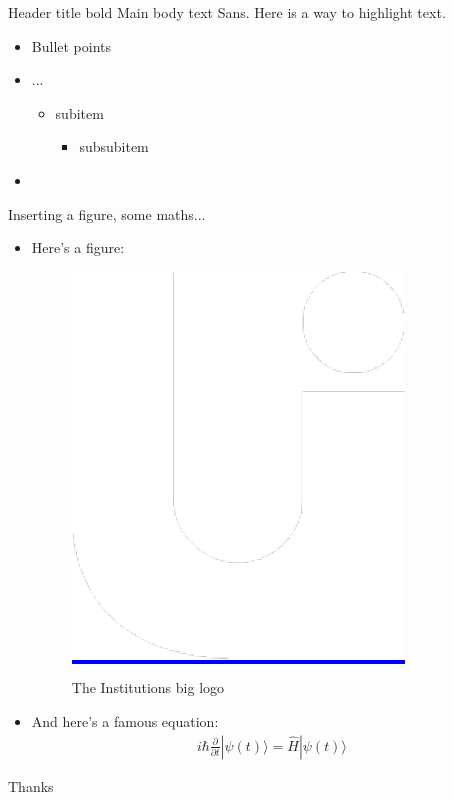 \documentclass{beamer}
\begin{document}
\begin{frame}[t]{Header title bold}
	Main body text Sans. Here is a way to \alert{highlight text}.
	\label{sec:Test1}
	\begin{itemize}
		\item Bullet points
		\item ...
			\begin{itemize}
				\item subitem
					\begin{itemize}
						\item subsubitem
					\end{itemize}
			\end{itemize}
		\item \lipsum[2]
	\end{itemize}
\end{frame}


\begin{frame}{Inserting a figure, some maths...}
\begin{itemize}
    \item   Here's a figure:
    \begin{figure}[h]
        \centering
        \colorbox{blue}{\includegraphics[width=.13\linewidth]{./assets/img/logo}}
        \caption{The Institutions big logo}
        \label{fig:big-u}
    \end{figure}
    \item 
    And here's a famous equation:
    \begin{eqnarray}
        \label{eq:schroedinger}
        i\hbar {\frac {\partial }{\partial t}}|\psi (t)\rangle =%
        {\hat {H}}|\psi (t)\rangle
    \end{eqnarray}
\end{itemize}
\end{frame}



\begin{frame}
\begin{center}
    {\fontsize{120}{72}\selectfont Thanks}
\end{center}
\end{frame}
\end{document}
